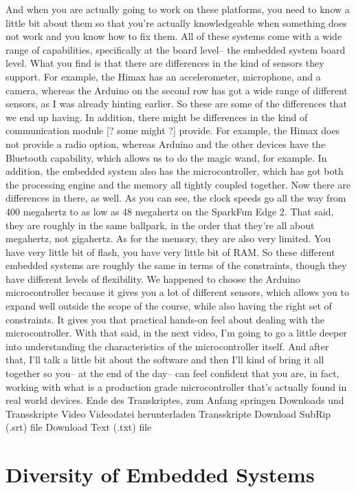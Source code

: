 And when you are actually going to work on these platforms,
you need to know a little bit about them so that you're actually
knowledgeable when something does not work and you know how to fix them.
All of these systems come with a wide range
of capabilities, specifically at the board level--
the embedded system board level.
What you find is that there are differences in the kind of sensors
they support.
For example, the Himax has an accelerometer, microphone,
and a camera, whereas the Arduino on the second row
has got a wide range of different sensors,
as I was already hinting earlier.
So these are some of the differences that we end up having.
In addition, there might be differences in the kind of communication
module [? some might ?] provide.
For example, the Himax does not provide a radio option,
whereas Arduino and the other devices have
the Bluetooth capability, which allows us to do the magic wand, for example.
In addition, the embedded system also has the microcontroller,
which has got both the processing engine and the memory all tightly coupled
together.
Now there are differences in there, as well.
As you can see, the clock speeds go all the way from 400 megahertz
to as low as 48 megahertz on the SparkFun Edge 2.
That said, they are roughly in the same ballpark,
in the order that they're all about megahertz, not gigahertz.
As for the memory, they are also very limited.
You have very little bit of flash, you have very little bit of RAM.
So these different embedded systems are roughly the same
in terms of the constraints, though they have different levels of flexibility.
We happened to choose the Arduino microcontroller because it gives you
a lot of different sensors, which allows you to expand well
outside the scope of the course, while also
having the right set of constraints.
It gives you that practical hands-on feel
about dealing with the microcontroller.
With that said, in the next video, I'm going
to go a little deeper into understanding the characteristics
of the microcontroller itself.
And after that, I'll talk a little bit about the software and then
I'll kind of bring it all together so you--
at the end of the day-- can feel confident
that you are, in fact, working with what is a production grade
microcontroller that's actually found in real world devices.
Ende des Transkriptes, zum Anfang springen
Downloads und Transskripte
Video
Videodatei herunterladen
Transskripte
Download SubRip (.srt) file
Download Text (.txt) file

\section{Diversity of Embedded Systems}

